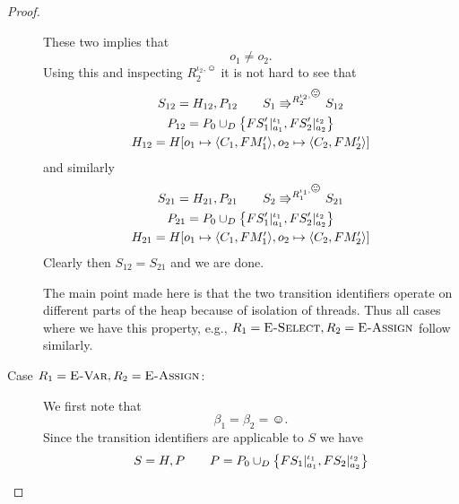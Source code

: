 \begin{proof}
\begin{description}
      These two implies that
      \begin{equation}
        o_1 \neq o_2.
      \end{equation}
      Using this and inspecting $R_2^{\iota_2, \smiley}$ it is not hard to see
      that 
      \begin{equation}
        \begin{gathered}
          S_{12} = H_{12}, P_{12} \andalso S_1 \Rrightarrow^{R_2^{\iota_2,
          \smiley}} S_{12}
          \\
          P_{12} = P_0 \cup_D \left\{ FS'_1|_{a_1}^{\iota_1},
          FS'_2|_{a_2}^{\iota_2} \right\} \\
          H_{12} = H[o_1 \mapsto \Obj{C_1, FM'_1}, o_2 \mapsto \Obj{C_2, FM'_2}]
        \end{gathered}
      \end{equation}
      and similarly 
      \begin{equation}
        \begin{gathered}
          S_{21} = H_{21}, P_{21} \andalso S_2 \Rrightarrow^{R_1^{\iota_1,
          \smiley}} S_{21}
          \\
          P_{21} = P_0 \cup_D \left\{ FS'_1|_{a_1}^{\iota_1},
          FS'_2|_{a_2}^{\iota_2} \right\} \\
          H_{21} = H[o_1 \mapsto \Obj{C_1, FM'_1}, o_2 \mapsto \Obj{C_2, FM'_2}]
        \end{gathered}
      \end{equation}
      Clearly then $S_{12} = S_{21}$ and we are done.
      \begin{remark}
        The main point made here is that the two transition identifiers operate
        on different parts of the heap because of isolation of threads. Thus all
        cases where we have this property, e.g., $R_1 = \mbox{{\sc E-Select}}, R_2 =
        \mbox{{\sc E-Assign}}$ follow similarly.
      \end{remark}
    \item[Case $R_1 = \mbox{{\sc E-Var}}, R_2 = \mbox{{\sc E-Assign}}$:] We first note that
      \begin{equation*}
        \beta_1 = \beta_2 = \smiley.
      \end{equation*}
      Since the transition identifiers are applicable to $S$ we have
      \begin{equation}
        \begin{gathered}
          S = H, P \andalso P = P_0 \cup_D \left\{ FS_1|_{a_1}^{\iota_1},
          FS_2|_{a_2}^{\iota_2} \right\} \\

\end{gathered}
\end{equation}
\end{description}
\end{proof}
